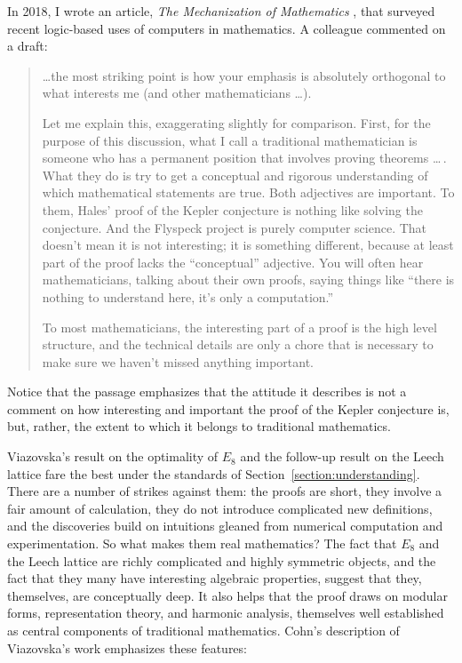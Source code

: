 \documentclass[12pt]{amsart}
\theoremstyle{definition}
\theoremstyle{remark}
\numberwithin{equation}{section}
\begin{document}
In 2018, I wrote an article, \emph{The Mechanization of Mathematics} \cite{avigad:18}, that surveyed recent logic-based uses of computers in mathematics. A colleague commented on a draft:
\begin{quote}
\ldots the most striking point is how your emphasis is absolutely orthogonal to what interests me (and other mathematicians \ldots).

Let me explain this, exaggerating slightly for comparison. First, for the purpose of this discussion, what I call a traditional mathematician is someone who has a permanent position that involves proving theorems
\ldots\,. What they do is try to get a conceptual and rigorous understanding of which mathematical statements are true. Both adjectives are important. To them, Hales' proof of the Kepler conjecture is nothing like solving the conjecture. And the Flyspeck project is purely computer science. That doesn't mean it is not interesting; it is something different, because at least part of the proof lacks the ``conceptual'' adjective. You will often hear mathematicians, talking about their own proofs, saying things like ``there is nothing to understand here, it's only a computation.''

To most mathematicians, the interesting part of a proof is the high level structure, and the technical details are only a chore that is necessary to make sure we haven't missed anything important.
\end{quote}
Notice that the passage emphasizes that the attitude it describes is not a comment on how interesting and important the proof of the Kepler conjecture is, but, rather, the extent to which it belongs to traditional mathematics.

Viazovska's result on the optimality of $E_8$ and the follow-up result on the Leech lattice fare the best under the standards of Section~\ref{section:understanding}. There are a number of strikes against them: the proofs are short, they involve a fair amount of calculation, they do not introduce complicated new definitions, and the discoveries build on intuitions gleaned from numerical computation and experimentation. So what makes them real mathematics? The fact that $E_8$ and the Leech lattice are richly complicated and highly symmetric objects, and the fact that they many have interesting algebraic properties, suggest that they, themselves, are conceptually deep. It also helps that the proof draws on modular forms, representation theory, and harmonic analysis, themselves well established as central components of traditional mathematics. Cohn's description of Viazovska's work emphasizes these features:
\end{document}

